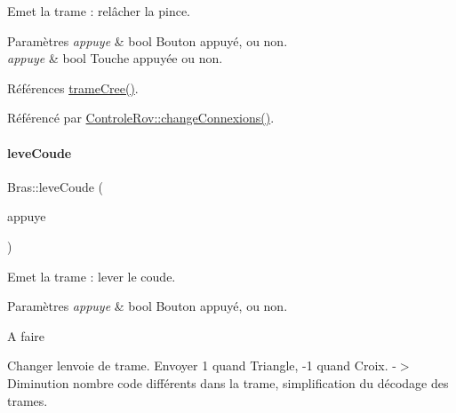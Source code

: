 Emet la trame \+: relâcher la pince.


\begin{DoxyParams}{Paramètres}
{\em appuye} & bool Bouton appuyé, ou non.\\
\hline
{\em appuye} & bool Touche appuyée ou non. \\
\hline
\end{DoxyParams}


Références \hyperlink{class_bras_ab442bf8d3e389c051b26b4b0741e7924}{trame\+Cree()}.



Référencé par \hyperlink{class_controle_rov_a400d5766b9acabb45c1af5f8b22bbe47}{Controle\+Rov\+::change\+Connexions()}.


\mbox{\label{class_bras_a197686a4ff55b4fe2384b2af44b8228b}} 
\paragraph{\texorpdfstring{leve\+Coude}{leveCoude}}
{\footnotesize\ttfamily Bras\+::leve\+Coude (\begin{DoxyParamCaption}\item[{bool}]{appuye }\end{DoxyParamCaption})\hspace{0.3cm}{\ttfamily [slot]}}

Emet la trame \+: lever le coude.


\begin{DoxyParams}{Paramètres}
{\em appuye} & bool Bouton appuyé, ou non.\\
\hline
\end{DoxyParams}
\begin{DoxyRefDesc}{A faire}
\item[\hyperlink{todo__todo000001}{A faire}]Changer l\textquotesingle{}envoie de trame. Envoyer 1 quand Triangle, -\/1 quand Croix. -\/$>$ Diminution nombre code différents dans la trame, simplification du décodage des trames. \end{DoxyRefDesc}



